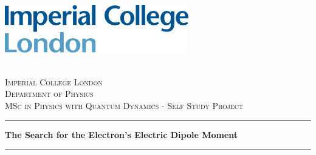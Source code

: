 \begin{titlepage}

\newcommand{\HRule}{\rule{\linewidth}{0.5mm}} %


\includegraphics[width=8cm]{images/logo.png}\\[1cm] %
 

\center %

\quad\\[1.5cm]
\textsc{\Large Imperial College London}\\[0.5cm] %
\textsc{\large Department of Physics}\\[0.5cm] %
\textsc{MSc in Physics with Quantum Dynamics - Self Study Project}\\[0.5cm]
\makeatletter
\begin{center}
    \rule{\textwidth}{.4pt}\par
    {\huge\bfseries The Search for the Electron's Electric Dipole Moment \par}
    \rule{\textwidth}{.4pt}\par
    \bigbreak
\end{center}
 


\end{titlepage}

